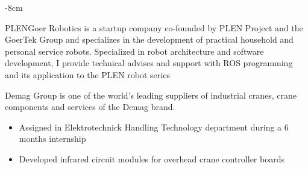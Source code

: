 \documentclass[10pt,a4paper]{altacv}
\begin{document}

\begin{adjustwidth}{}{-8cm}
\makecvheader
\end{adjustwidth}


PLENGoer Robotics is a startup company co-founded by PLEN Project and the GoerTek Group and specializes in the development of practical household and personal service robots.
Specialized in robot architecture and software development, I provide technical advises and support with ROS programming and its application to the PLEN robot series

\divider

Demag Group is one of the world's leading suppliers of industrial cranes, crane components and services of the Demag brand.
\begin{itemize}
\item Assigned in Elektrotechnick Handling Technology department during a 6 months internship
\item Developed infrared circuit modules for overhead crane controller boards
\end{itemize}

\divider
\end{document}
